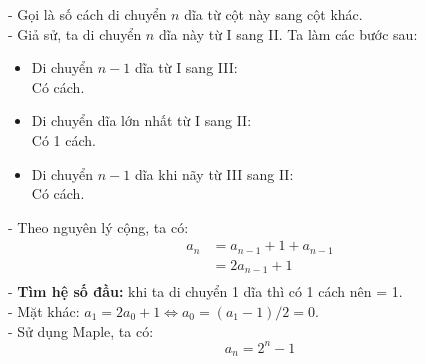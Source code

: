 \documentclass[main.tex]{subfiles}
\begin{document}
- Gọi  là số cách di chuyển $n$ dĩa từ cột này sang cột khác. \\
- Giả sử, ta di chuyển $n$ dĩa này từ I sang II. Ta làm các bước sau:
\begin{itemize}
    \item Di chuyển $n-1$ dĩa từ I sang III:\\ Có  cách.
    \item Di chuyển dĩa lớn nhất từ I sang II:\\ Có 1 cách.
    \item Di chuyển $n-1$ dĩa khi nãy từ III sang II:\\ Có  cách.
\end{itemize}
- Theo nguyên lý cộng, ta có:
\begin{align*}
a_n &= a_{n-1} + 1 + a_{n-1} \\
 &= 2a_{n-1}+1 \\
\end{align*}
- \textbf{Tìm hệ số đầu:} khi ta di chuyển 1 dĩa thì có 1 cách nên  = 1.\\
- Mặt khác: $a_1 = 2a_0 + 1 \Leftrightarrow a_0 = {(a_1-1)}/{2}=0$.\\
- Sử dụng Maple, ta có:
$$
a_n = 2^n-1
$$
\end{document}
